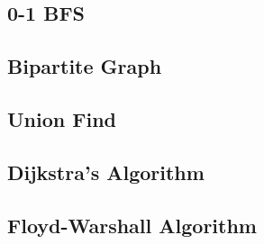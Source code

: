\documentclass[10pt, a4paper]{article}
\begin{document}
\subsection{0-1 BFS}


\subsection{Bipartite Graph}


\subsection{Union Find}


\subsection{Dijkstra's Algorithm}


\subsection{Floyd-Warshall Algorithm}

\end{document}
